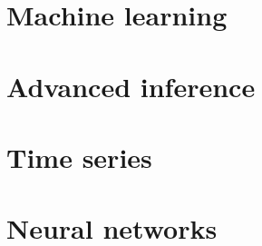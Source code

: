 \documentclass[oneside]{book}
\begin{document}
\part{Machine learning}







\part{Advanced inference}






\part{Time series}





\part{Neural networks}




\end{document}

